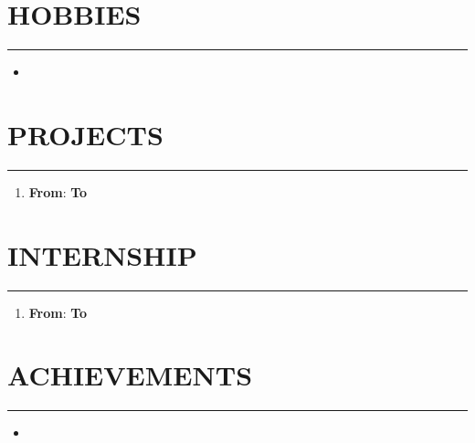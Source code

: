 \documentclass{article}
\newcommand{\VAR}[1]{}
\newcommand{\BLOCK}[1]{}
\begin{document}
\section*{\large{\uppercase{Hobbies}}}
\hrule
\vspace{3pt}
\begin{itemize}[noitemsep,nolistsep]
\BLOCK{ for x in hobby }
	\BLOCK{ if x != '' }
		\item \VAR{x}
	\BLOCK{ endif }
\BLOCK{ endfor }	
\end{itemize}

\vspace{3pt}
\section*{\large{\uppercase{projects}}}
\hrule
\vspace{3pt}

\begin{enumerate}
\BLOCK{ for i in items } 
	\BLOCK{ if i['proname'] != '' }
	\item {\textbf{\VAR{i['proname']}}}\hfill {\textbf{From}}: \VAR{i['profrom']} {\textbf{To}} \VAR{i['proto']}\\
	\VAR{i['prodescription']}
	\BLOCK{ endif }
\BLOCK{ endfor }
\end{enumerate}
	
\vspace{3pt}
\section*{\large{\uppercase{Internship}}}
\hrule
\vspace{3pt}
\begin{enumerate}
\BLOCK{ for i in ship } 
	\BLOCK{ if i['intitle'] != '' }
	\item {\textbf{\VAR{i['intitle']}}}\hfill {\textbf{From}}: \VAR{i['infrom']} {\textbf{To}} \VAR{i['into']}\\
	\VAR{i['indescription']}
	\BLOCK{ endif }
\BLOCK{ endfor }
\end{enumerate}

\vspace{3pt}

\section*{\large{\uppercase{achievements}}}
\hrule
\vspace{3pt}
\begin{itemize}[noitemsep,nolistsep]
\BLOCK{ for x in achievement }
	\BLOCK{ if x != '' }
		\item \VAR{x}
	\BLOCK{ endif }
\BLOCK{ endfor }
\end{itemize}

\vspace{3pt}
\end{document}
